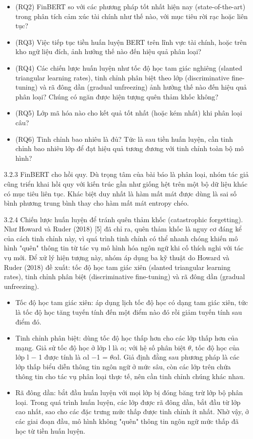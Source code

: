 \begin{itemize}
\item
  (RQ2) FinBERT so với các phương pháp tốt nhất hiện nay (state-of-the-art) trong phân tích cảm xúc tài chính như thế nào, với mục tiêu rời rạc hoặc liên tục?
\item
  (RQ3) Việc tiếp tục tiền huấn luyện BERT trên lĩnh vực tài chính, hoặc trên kho ngữ liệu đích, ảnh hưởng thế nào đến hiệu quả phân loại?
\item
  (RQ4) Các chiến lược huấn luyện như tốc độ học tam giác nghiêng (slanted triangular learning rates), tinh chỉnh phân biệt theo lớp (discriminative fine-tuning) và rã đông dần (gradual unfreezing) ảnh hưởng thế nào đến hiệu quả phân loại? Chúng có ngăn được hiện tượng quên thảm khốc không?
\item
  (RQ5) Lớp mã hóa nào cho kết quả tốt nhất (hoặc kém nhất) khi phân loại câu?
\item
  (RQ6) Tinh chỉnh bao nhiêu là đủ? Tức là sau tiền huấn luyện, cần tinh chỉnh bao nhiêu lớp để đạt hiệu quả tương đương với tinh chỉnh toàn bộ mô hình?
\end{itemize}

3.2.3 FinBERT cho hồi quy. Dù trọng tâm của bài báo là phân loại, nhóm tác giả cũng triển khai hồi quy với kiến trúc gần như giống hệt trên một bộ dữ liệu khác có mục tiêu liên tục. Khác biệt duy nhất là hàm mất mát được dùng là sai số bình phương trung bình thay cho hàm mất mát entropy chéo.

3.2.4 Chiến lược huấn luyện để tránh quên thảm khốc (catastrophic forgetting). Như Howard và Ruder (2018) {[}5{]} đã chỉ ra, quên thảm khốc là nguy cơ đáng kể của cách tinh chỉnh này, vì quá trình tinh chỉnh có thể nhanh chóng khiến mô hình "quên" thông tin từ tác vụ mô hình hóa ngôn ngữ khi cố thích nghi với tác vụ mới. Để xử lý hiện tượng này, nhóm áp dụng ba kỹ thuật do Howard và Ruder (2018) đề xuất: tốc độ học tam giác xiên (slanted triangular learning rates), tinh chỉnh phân biệt (discriminative fine-tuning) và rã đông dần (gradual unfreezing).

\begin{itemize}
\item
  Tốc độ học tam giác xiên: áp dụng lịch tốc độ học có dạng tam giác xiên, tức là tốc độ học tăng tuyến tính đến một điểm nào đó rồi giảm tuyến tính sau điểm đó.
\item
  Tinh chỉnh phân biệt: dùng tốc độ học thấp hơn cho các lớp thấp hơn của mạng. Giả sử tốc độ học ở lớp l là \ensuremath{\alpha}; với hệ số phân biệt \ensuremath{\theta}, tốc độ học của lớp l \ensuremath{-} 1 được tính là \ensuremath{\alpha}l \ensuremath{-}1 = \ensuremath{\theta}\ensuremath{\alpha}l. Giả định đằng sau phương pháp là các lớp thấp biểu diễn thông tin ngôn ngữ ở mức sâu, còn các lớp trên chứa thông tin cho tác vụ phân loại thực tế, nên cần tinh chỉnh chúng khác nhau.
\item
  Rã đông dần: bắt đầu huấn luyện với mọi lớp bị đóng băng trừ lớp bộ phân loại. Trong quá trình huấn luyện, các lớp được rã đông dần, bắt đầu từ lớp cao nhất, sao cho các đặc trưng mức thấp được tinh chỉnh ít nhất. Nhờ vậy, ở các giai đoạn đầu, mô hình không "quên" thông tin ngôn ngữ mức thấp đã học từ tiền huấn luyện.
\end{itemize}

